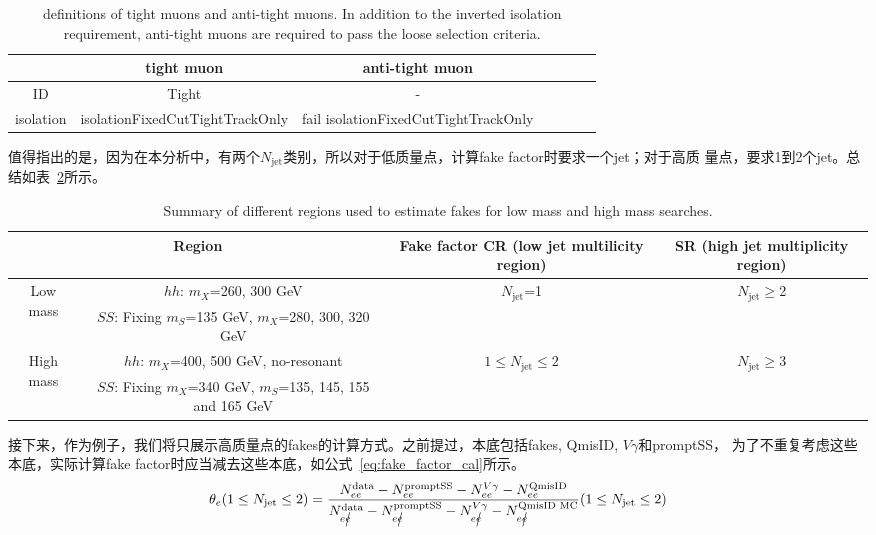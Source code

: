 \begin{table}[!ht]
\begin{center}
\begin{tabular}{c|cccccc}
\hline
  &tight muon    &anti-tight muon  \\
\hline
ID  &Tight  &- \\
isolation &isolationFixedCutTightTrackOnly  &fail isolationFixedCutTightTrackOnly \\
\hline
\end{tabular}
\caption{definitions of tight muons and anti-tight muons. In addition to the inverted isolation requirement,
anti-tight muons are required to pass the loose selection criteria.}
\label{tab:tight_mu_def}
\end{center}
\end{table}
值得指出的是，因为在本分析中，有两个$N_{\text{jet}}$类别，所以对于低质量点，计算fake factor时要求一个jet；对于高质
量点，要求1到2个jet。总结如表~\ref{tab:summary_CRs_ff}所示。
\begin{table}[!ht]
\begin{center}
\scriptsize
\begin{tabular}{cc|c|c}
\hline
\multicolumn{2}{c|}{Region}  &Fake factor CR (low jet multilicity region) &SR (high jet multiplicity region)  \\
\hline
\multirow{2}{*}{Low mass} &$hh$: $m_X$=260, 300 GeV  &$N_{\text{jet}}$=1    &$N_{\text{jet}} \geq$2 \\
                          &$SS$: Fixing $m_S$=135 GeV, $m_X$=280, 300, 320 GeV  &  & \\
\hline
\multirow{2}{*}{High mass} &$hh$: $m_X$=400, 500 GeV, no-resonant  &$1\leq N_{\text{jet}} \leq 2$    &$N_{\text{jet}} \geq$3 \\
                          &$SS$: Fixing $m_X$=340 GeV, $m_S$=135, 145, 155 and 165 GeV  &  & \\

\hline
\end{tabular}
\caption{Summary of different regions used to estimate fakes for low mass and high mass searches.}
\label{tab:summary_CRs_ff}
\end{center}
\end{table}
接下来，作为例子，我们将只展示高质量点的fakes的计算方式。之前提过，本底包括fakes, QmisID, $V\gamma$和promptSS，
为了不重复考虑这些本底，实际计算fake factor时应当减去这些本底，如公式~\ref{eq:fake_factor_cal}所示。
\begin{equation}
\theta_{e}(1\leq N_{\text{jet}}\leq 2)=\frac{N_{ee}^{\text{data}}-N_{ee}^{\text{promptSS}}-N_{ee}^{V\gamma}-N_{ee}^{\text{QmisID}}}{N_{e\cancel{e}}^{\text{data}}-N_{e\cancel{e}}^{\text{promptSS}}-N_{e\cancel{e}}^{V\gamma}-N_{e\cancel{e}}^{\text{QmisID MC}}}(1\leq N_{\text{jet}}\leq 2)
\end{equation}

